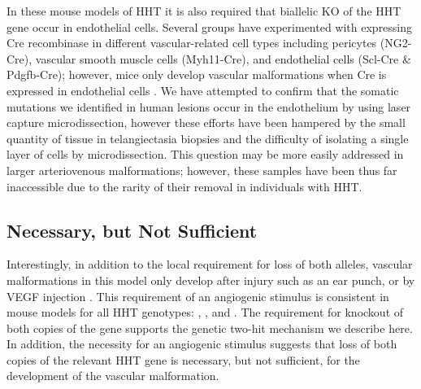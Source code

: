 	In these mouse models of HHT it is also required that biallelic KO of the HHT gene occur in endothelial cells. Several groups have experimented with expressing Cre recombinase in different vascular-related cell types including pericytes (NG2-Cre), vascular smooth muscle cells (Myh11-Cre), and endothelial cells (Scl-Cre \& Pdgfb-Cre); however, mice only develop vascular malformations when Cre is expressed in endothelial cells \citep{tualchalot2015, choi2014, garridomartin2014, mahmoud2010}. We have attempted to confirm that the somatic mutations we identified in human lesions occur in the endothelium by using laser capture microdissection, however these efforts have been hampered by the small quantity of tissue in telangiectasia biopsies and the difficulty of isolating a single layer of cells by microdissection. This question may be more easily addressed in larger arteriovenous malformations; however, these samples have been thus far inaccessible due to the rarity of their removal in individuals with HHT.
	
\subsection{Necessary, but Not Sufficient}
Interestingly, in addition to the local requirement for loss of both alleles, vascular malformations in this model only develop after injury such as an ear punch, or by VEGF injection \citep{choi2012}. This requirement of an angiogenic stimulus is consistent in mouse models for all HHT genotypes: , , and  \citep{kim2018}. The requirement for knockout of both copies of the gene supports the genetic two-hit mechanism we describe here. In addition, the necessity for an angiogenic stimulus suggests that loss of both copies of the relevant HHT gene is necessary, but not sufficient, for the development of the vascular malformation. 

